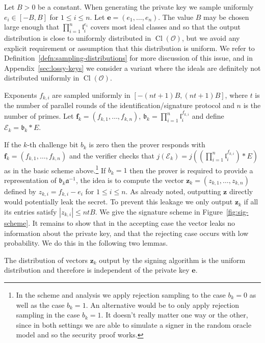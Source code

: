 \documentclass{llncs}
\newcommand{\E}{\mathcal{E}}
\newcommand{\OO}{\mathcal{O}}
\DeclareMathOperator{\Cl}{Cl}
\renewcommand{\a}{\mathfrak{a}}
\renewcommand{\b}{\mathfrak{b}}
\renewcommand{\l}{\mathfrak{l}}
\newcommand{\e}{\mathbf{e}}
\newcommand{\f}{\mathbf{f}}
\newcommand{\z}{\mathbf{z}}
\begin{document}
Let $B > 0$ be a constant. When generating the private key we sample uniformly $e_i \in [-B, B]$ for $1 \le i \le n$. Let $\e = ( e_1, \dots, e_n )$.
The value $B$ may be chosen large enough that $\prod_{i=1}^n \l_i^{e_i}$ covers most ideal classes and so that the output distribution is close to uniformly distributed in $\Cl(\OO)$, but we avoid any explicit requirement or assumption that this distribution is uniform.
We refer to Definition~\ref{defn:sampling-distributions} for more discussion of this issue, and in Appendix~\ref{sec:lossy-keys} we consider a variant where the ideals are definitely not distributed uniformly in $\Cl(\OO)$.

Exponents $f_{k,i}$ are sampled uniformly in $[-(nt+1)B, (nt+1)B]$, where $t$ is the number of parallel rounds of the identification/signature protocol and $n$ is the number of primes.
Let $\f_k = (f_{k,1}, \dots, f_{k,n} )$, $\b_k = \prod_{i=1}^n \l_i^{f_{k,i}}$ and define $\E_k = \b_k * E $.


If the $k$-th challenge bit $b_k$ is zero then the prover responds with $\f_k = ( f_{k,1}, \dots, f_{k,n} )$ and the verifier checks that $j(\E_k) = j( (\prod_{i=1}^n \l_i^{f_{k,i}}) * E )$ as in the basic scheme above.\footnote{In the scheme and analysis we apply rejection sampling to the case $b_k = 0$ as well as the case $b_k = 1$. An alternative would be to only apply rejection sampling in the case $b_k = 1$. It doesn't really matter one way or the other, since in both settings we are able to simulate a signer in the random oracle model and so the security proof works.}
If $b_k = 1$ then the prover is required to provide a representation of $\b_k \a^{-1}$, the idea is to compute the vector $\z_k = (z_{k,1}, \dots, z_{k,n}) $ defined by $z_{k,i} = f_{k,i} - e_i $ for $1 \le i \le n$.
As already noted, outputting $\z$ directly would potentially leak the secret.
To prevent this leakage we only output $\z_k$ if all its entries satisfy $| z_{k,i} | \le nt B$.
We give the signature scheme in Figure~\ref{fig:sig-scheme}.
It remains to show that in the accepting case the vector leaks no information about the private key, and that the rejecting case occurs with low probability. We do this in the following two lemmas.

\begin{lemma} \label{lem:sim2}
The distribution of vectors $\z_k$ output by the signing algorithm is the uniform distribution and therefore is independent of the private key $\e$.
\end{lemma}
\end{document}
